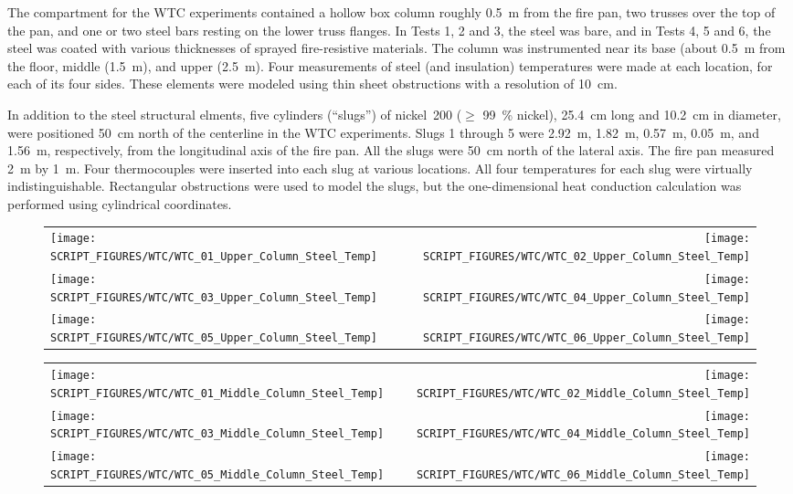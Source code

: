 The compartment for the WTC experiments contained a hollow box column roughly 0.5~m from the fire pan, two trusses over the top of the pan, and one or two steel bars resting on the lower truss flanges. In Tests 1, 2 and 3, the steel was bare, and in Tests 4, 5 and 6, the steel was coated with various thicknesses of sprayed fire-resistive materials. The column was instrumented near its base (about 0.5~m from the floor, middle (1.5~m), and upper (2.5~m). Four measurements of steel (and insulation) temperatures were made at each location, for each of its four sides. These elements were modeled using thin sheet obstructions with a resolution of 10~cm.

In addition to the steel structural elments, five cylinders (``slugs'') of nickel~200 ($\ge$ 99~\% nickel), 25.4~cm long and 10.2~cm in diameter, were positioned 50~cm north of the centerline in the WTC experiments. Slugs 1 through 5 were 2.92~m, 1.82~m, 0.57~m, 0.05~m, and 1.56~m, respectively, from the longitudinal axis of the fire pan. All the slugs were 50~cm north of the lateral axis. The fire pan measured 2~m by 1~m. Four thermocouples were inserted into each slug at various locations. All four temperatures for each slug were virtually indistinguishable. Rectangular obstructions were used to model the slugs, but the one-dimensional heat conduction calculation was performed using cylindrical coordinates.

\newpage

\begin{figure}[p]
\begin{tabular*}{\textwidth}{l@{\extracolsep{\fill}}r}
\texttt{[image: SCRIPT\_FIGURES/WTC/WTC\_01\_Upper\_Column\_Steel\_Temp]} &
\texttt{[image: SCRIPT\_FIGURES/WTC/WTC\_02\_Upper\_Column\_Steel\_Temp]} \\
\texttt{[image: SCRIPT\_FIGURES/WTC/WTC\_03\_Upper\_Column\_Steel\_Temp]} &
\texttt{[image: SCRIPT\_FIGURES/WTC/WTC\_04\_Upper\_Column\_Steel\_Temp]} \\
\texttt{[image: SCRIPT\_FIGURES/WTC/WTC\_05\_Upper\_Column\_Steel\_Temp]} &
\texttt{[image: SCRIPT\_FIGURES/WTC/WTC\_06\_Upper\_Column\_Steel\_Temp]}
\end{tabular*}
\label{NIST_WTC_Upper_Column_Steel}
\end{figure}

\begin{figure}[p]
\begin{tabular*}{\textwidth}{l@{\extracolsep{\fill}}r}
\texttt{[image: SCRIPT\_FIGURES/WTC/WTC\_01\_Middle\_Column\_Steel\_Temp]} &
\texttt{[image: SCRIPT\_FIGURES/WTC/WTC\_02\_Middle\_Column\_Steel\_Temp]} \\
\texttt{[image: SCRIPT\_FIGURES/WTC/WTC\_03\_Middle\_Column\_Steel\_Temp]} &
\texttt{[image: SCRIPT\_FIGURES/WTC/WTC\_04\_Middle\_Column\_Steel\_Temp]} \\
\texttt{[image: SCRIPT\_FIGURES/WTC/WTC\_05\_Middle\_Column\_Steel\_Temp]} &
\texttt{[image: SCRIPT\_FIGURES/WTC/WTC\_06\_Middle\_Column\_Steel\_Temp]}
\end{tabular*}
\label{NIST_WTC_Middle_Column_Steel}
\end{figure}

